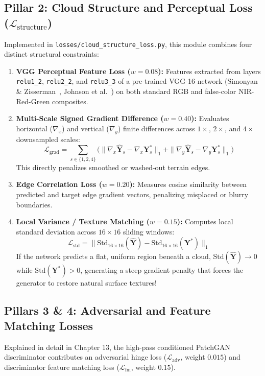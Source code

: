 \subsection{Pillar 2: Cloud Structure and Perceptual Loss (\texorpdfstring{$\mathcal{L}_{\text{structure}}$}{L_structure})}
Implemented in \texttt{losses/cloud\_structure\_loss.py}, this module combines four distinct structural constraints:
\begin{enumerate}
    \item \textbf{VGG Perceptual Feature Loss ($w = 0.08$):} Features extracted from layers \texttt{relu1\_2}, \texttt{relu2\_2}, and \texttt{relu3\_3} of a pre-trained VGG-16 network (Simonyan \& Zisserman~\cite{simonyan2015vgg}, Johnson et al.~\cite{johnson2016perceptual}) on both standard RGB and false-color NIR-Red-Green composites.
    \item \textbf{Multi-Scale Signed Gradient Difference ($w = 0.40$):} Evaluates horizontal ($\nabla_x$) and vertical ($\nabla_y$) finite differences across $1\times$, $2\times$, and $4\times$ downsampled scales:
    \begin{equation}
    \mathcal{L}_{\text{grad}} = \sum_{s \in \{1, 2, 4\}} \Big( \|\nabla_x \hat{\mathbf{Y}}_s - \nabla_x \mathbf{Y}^*_s\|_1 + \|\nabla_y \hat{\mathbf{Y}}_s - \nabla_y \mathbf{Y}^*_s\|_1 \Big)
    \end{equation}
    This directly penalizes smoothed or washed-out terrain edges.
    \item \textbf{Edge Correlation Loss ($w = 0.20$):} Measures cosine similarity between predicted and target edge gradient vectors, penalizing misplaced or blurry boundaries.
    \item \textbf{Local Variance / Texture Matching ($w = 0.15$):} Computes local standard deviation across $16 \times 16$ sliding windows:
    \begin{equation}
    \mathcal{L}_{\text{std}} = \|\text{Std}_{16\times 16}(\hat{\mathbf{Y}}) - \text{Std}_{16\times 16}(\mathbf{Y}^*)\|_1
    \end{equation}
    If the network predicts a flat, uniform region beneath a cloud, $\text{Std}(\hat{\mathbf{Y}}) \to 0$ while $\text{Std}(\mathbf{Y}^*) > 0$, generating a steep gradient penalty that forces the generator to restore natural surface textures!
\end{enumerate}

\subsection{Pillars 3 \& 4: Adversarial and Feature Matching Losses}
Explained in detail in Chapter 13, the high-pass conditioned PatchGAN discriminator contributes an adversarial hinge loss ($\mathcal{L}_{\text{adv}}$, weight $0.015$) and discriminator feature matching loss ($\mathcal{L}_{\text{fm}}$, weight $0.15$).

